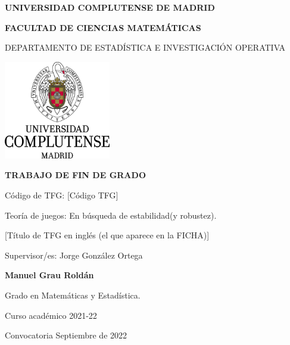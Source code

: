 \documentclass[a4paper]{report} %
\begin{document}
\begin{titlepage}
\centering
{ \bfseries \Large UNIVERSIDAD COMPLUTENSE DE MADRID}
\vspace{0.5cm}

{\bfseries  \Large FACULTAD DE CIENCIAS MATEMÁTICAS} 
\vspace{1cm}

{\large DEPARTAMENTO DE ESTADÍSTICA E INVESTIGACIÓN OPERATIVA}
\vspace{0.8cm}

{\includegraphics[width=0.35\textwidth]{logo_UCM}} %
\vspace{0.8cm}

{\bfseries \Large TRABAJO DE FIN DE GRADO}
\vspace{2cm}

{\Large Código de TFG:  [C\'odigo TFG] } \vspace{5mm}

{\Large Teoría de juegos: En búsqueda de estabilidad(y robustez).}\vspace{5mm}

{\Large [Título de TFG en ingl\'es (el que aparece en la FICHA)]}\vspace{5mm}

{\Large Supervisor/es: Jorge González Ortega }\vspace{20mm} 

{\bfseries \LARGE Manuel Grau Roldán}\vspace{5mm} 

{\large Grado en Matemáticas y Estadística.}\vspace{5mm} 

{\large Curso acad\'emico 2021-22}\vspace{5mm} 

{\large Convocatoria Septiembre de 2022}\vspace{5mm} 

\end{titlepage}
\end{document}
